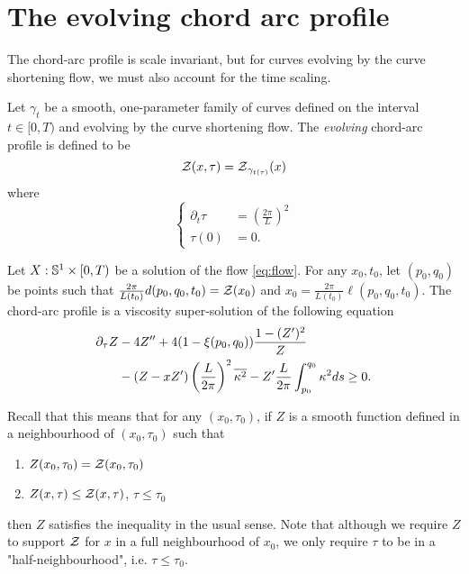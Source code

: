 \documentclass[a4paper, 12pt]{amsart}
\begin{document}
\section{The evolving chord arc profile}
\label{sec:evolving_chordarc}

The chord-arc profile is scale invariant, but for curves evolving by the curve shortening flow, we must also account for the time scaling.

\begin{defn}
\label{defn:timeprofile}
Let \(\gamma_t\) be a smooth, one-parameter family of curves defined on the interval \(t \in [0, T)\) and evolving by the curve shortening flow. The \emph{evolving} chord-arc profile is defined to be
\[
\chordarcprofile(x, \tau) = \chordarcprofile_{\gamma_{t(\tau)}} (x)
\]
where
\[
\begin{cases}
\partial_t \tau &= \left(\frac{2\pi}{L}\right)^2 \\
\tau(0) &= 0.
\end{cases}
\]
\end{defn}

\begin{thm}
\label{thm:viscosity}
Let $X: \S^1\times [0,T)$ be a solution of the flow \eqref{eq:flow}. For any \(x_0, t_0\), let $(p_0,q_0)$ be points such that $\tfrac{2\pi}{L(t_0)} d(p_0, q_0, t_0) = \chordarcprofile(x_0)$ and $x_0 = \frac{2\pi}{L(t_0)} \ell(p_0, q_0, t_0)$. The chord-arc profile is a viscosity super-solution of the following equation
\[
\begin{split}
\partial_{\tau} Z & -4 Z'' + 4(1-\xi(p_0,q_0)) \frac{1 - (Z')^2}{Z} \\
& - (Z - x Z') \left(\frac{L}{2\pi}\right)^2 \avg{\kappa^2} - Z' \frac{L}{2\pi} \int_{p_0}^{q_0} \kappa^2 ds \geq 0.
\end{split}
\]
\end{thm}

Recall that this means that for any $(x_0,\tau_0)$, if $Z$ is a smooth function defined in a neighbourhood of $(x_0,\tau_0)$ such that
\begin{enumerate}
\item $Z(x_0, \tau_0) = \chordarcprofile (x_0, \tau_0)$
\item $Z(x, \tau) \leq \chordarcprofile (x, \tau)$, $\tau \leq \tau_0$
\end{enumerate}
then $Z$ satisfies the inequality in the usual sense. Note that although we require $Z$ to support $\chordarcprofile$ for $x$ in a full neighbourhood of $x_0$, we only require $\tau$ to be in a "half-neighbourhood", i.e. $\tau\leq \tau_0$.
\end{document}
